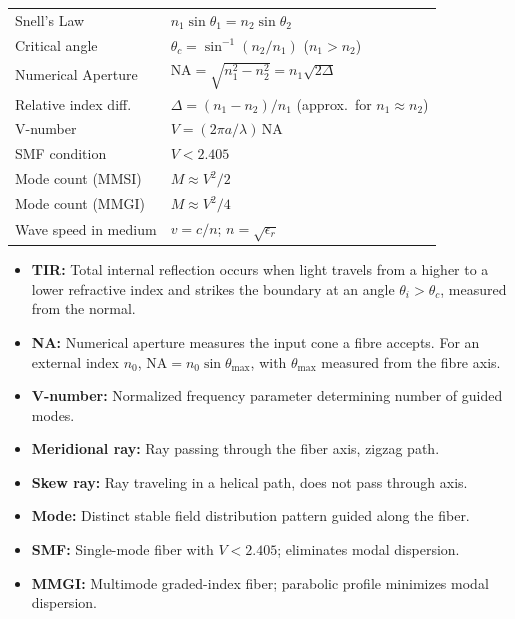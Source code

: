 \documentclass[12pt,a4paper]{article}
\renewcommand{\arraystretch}{1.45}
\begin{document}
\begin{tcolorbox}[formulabox, title={\textbf{Key Formulas at a Glance}}]
\renewcommand{\arraystretch}{1.35}
\begin{tabularx}{\linewidth}{B{5.0cm} X}
Snell's Law & $n_1 \sin\theta_1 = n_2 \sin\theta_2$ \\[4pt]
Critical angle & $\theta_c = \sin^{-1}(n_2/n_1)$ \quad ($n_1 > n_2$) \\[4pt]
Numerical Aperture & $\text{NA} = \sqrt{n_1^2 - n_2^2} = n_1\sqrt{2\Delta}$ \\[4pt]
Relative index diff.\ & $\Delta = (n_1 - n_2)/n_1$ (approx.\ for $n_1 \approx n_2$) \\[4pt]
V-number & $V = (2\pi a/\lambda)\,\text{NA}$ \\[4pt]
SMF condition & $V < 2.405$ \\[4pt]
Mode count (MMSI) & $M \approx V^2/2$ \\[4pt]
Mode count (MMGI) & $M \approx V^2/4$ \\[4pt]
Wave speed in medium & $v = c/n$; \quad $n = \sqrt{\epsilon_r}$ \\[4pt]
\end{tabularx}
\end{tcolorbox}

\begin{tcolorbox}[defbox, title={\textbf{One-Line Definitions}}]
\begin{itemize}[leftmargin=*, itemsep=2pt, topsep=0pt]
  \item \textbf{TIR:} Total internal reflection occurs when light travels from a higher to a lower refractive index and strikes the boundary at an angle $\theta_i>\theta_c$, measured from the normal.
  \item \textbf{NA:} Numerical aperture measures the input cone a fibre accepts. For an external index $n_0$, $\mathrm{NA}=n_0\sin\theta_{\max}$, with $\theta_{\max}$ measured from the fibre axis.
  \item \textbf{V-number:} Normalized frequency parameter determining number of guided modes.
  \item \textbf{Meridional ray:} Ray passing through the fiber axis, zigzag path.
  \item \textbf{Skew ray:} Ray traveling in a helical path, does not pass through axis.
  \item \textbf{Mode:} Distinct stable field distribution pattern guided along the fiber.
  \item \textbf{SMF:} Single-mode fiber with $V < 2.405$; eliminates modal dispersion.
  \item \textbf{MMGI:} Multimode graded-index fiber; parabolic profile minimizes modal dispersion.
\end{itemize}
\end{tcolorbox}
\end{document}
